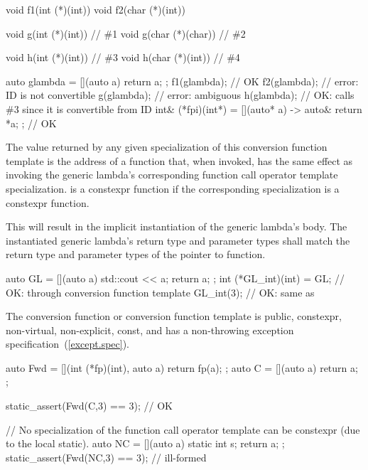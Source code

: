 \begin{example}
\begin{codeblock}
void f1(int (*)(int))   { }
void f2(char (*)(int))  { }

void g(int (*)(int))    { }  // \#1
void g(char (*)(char))  { }  // \#2

void h(int (*)(int))    { }  // \#3
void h(char (*)(int))   { }  // \#4

auto glambda = [](auto a) { return a; };
f1(glambda);  // OK
f2(glambda);  // error: ID is not convertible
g(glambda);   // error: ambiguous
h(glambda);   // OK: calls \#3 since it is convertible from ID
int& (*fpi)(int*) = [](auto* a) -> auto& { return *a; }; // OK
\end{codeblock}
\end{example}

The value returned by any given specialization of this conversion function
template is the address of a function  that, when invoked, has the same
effect as invoking the generic lambda's corresponding function call operator
template specialization.
 is a constexpr function
if the corresponding specialization is a constexpr function.
\begin{note}
This will result in the implicit instantiation of the generic lambda's body.
The instantiated generic lambda's return type and parameter types shall match
the return type and parameter types of the pointer to function.
\end{note}
\begin{example}
\begin{codeblock}
auto GL = [](auto a) { std::cout << a; return a; };
int (*GL_int)(int) = GL;  // OK: through conversion function template
GL_int(3);                // OK: same as 
\end{codeblock}
\end{example}

The conversion function or conversion function template is public,
constexpr, non-virtual, non-explicit, const, and has a non-throwing exception
specification~(\ref{except.spec}).
\begin{example}
\begin{codeblock}
auto Fwd = [](int (*fp)(int), auto a) { return fp(a); };
auto C = [](auto a) { return a; };

static_assert(Fwd(C,3) == 3); // OK

// No specialization of the function call operator template can be constexpr (due to the local static).
auto NC = [](auto a) { static int s; return a; };
static_assert(Fwd(NC,3) == 3); // ill-formed
\end{codeblock}
\end{example}

